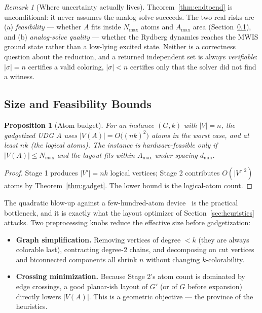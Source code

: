 \documentclass[11pt]{article}
\newtheorem{proposition}[theorem]{Proposition}
\theoremstyle{definition}
\theoremstyle{remark}
\newtheorem{remark}[theorem]{Remark}
\begin{document}
\begin{remark}[Where uncertainty actually lives]
Theorem~\ref{thm:endtoend} is unconditional: it never assumes the analog solve
succeeds. The two real risks are (a) \emph{feasibility} --- whether $A$ fits inside
$N_{\max}$ atoms and $A_{\max}$ area (Section~\ref{sec:size}), and (b)
\emph{analog-solve quality} --- whether the Rydberg dynamics reaches the MWIS ground
state rather than a low-lying excited state. Neither is a correctness question about
the reduction, and a returned independent set is always \emph{verifiable}: $|\sigma|=n$
certifies a valid coloring, $|\sigma|<n$ certifies only that the solver did not find a
witness.
\end{remark}

\subsection{Size and Feasibility Bounds}
\label{sec:size}

\begin{proposition}[Atom budget]
\label{prop:atombudget}
For an instance $(G,k)$ with $|V|=n$, the gadgetized UDG $A$ uses
$|V(A)| = O\!\bigl((nk)^2\bigr)$ atoms in the worst case, and at least $nk$ (the
logical atoms). The instance is hardware-feasible only if $|V(A)|\le N_{\max}$ and the
layout fits within $A_{\max}$ under spacing $d_{\min}$.
\end{proposition}

\begin{proof}
Stage 1 produces $|V'|=nk$ logical vertices; Stage 2 contributes $O(|V'|^2)$ atoms by
Theorem~\ref{thm:gadget}. The lower bound is the logical-atom count.
\end{proof}

The quadratic blow-up against a few-hundred-atom device~\cite{Wurtz2023} is the
practical bottleneck, and it is exactly what the layout optimizer of
Section~\ref{sec:heuristics} attacks. Two preprocessing knobs reduce the effective size
before gadgetization:
\begin{itemize}[leftmargin=1.4em]
  \item \textbf{Graph simplification.} Removing vertices of degree $<k$ (they are
        always colorable last), contracting degree-2 chains, and decomposing on cut
        vertices and biconnected components all shrink $n$ without changing
        $k$-colorability.
  \item \textbf{Crossing minimization.} Because Stage 2's atom count is dominated by
        edge crossings, a good planar-ish layout of $G'$ (or of $G$ before expansion)
        directly lowers $|V(A)|$. This is a geometric objective --- the province of the
        heuristics.
\end{itemize}
\end{document}
